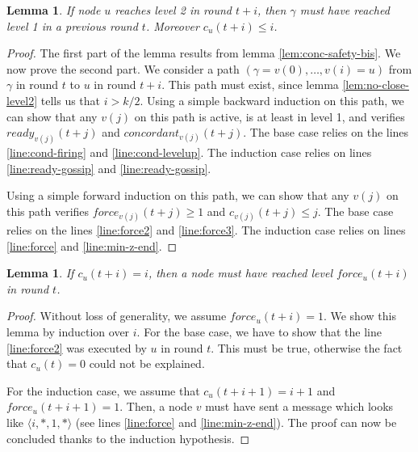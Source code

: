 \documentclass[11pt,letterpaper]{article}
\renewcommand{\leq}{\leqslant}
\renewcommand{\geq}{\geqslant}
\newtheorem{lem}[thm]{Lemma}
\newcommand{\cent}{\gamma}
\begin{document}
\begin{lem} \label{lem:ready-safety}
	If node $u$ reaches level 2 in round $t+i$, then $\cent$ must have reached level 1 in a previous round $t$. Moreover $c_u(t+i) \leq i$.
\end{lem}
\begin{proof}
	The first part of the lemma results from lemma \ref{lem:conc-safety-bis}. We now prove the second part.
	We consider a path $(\cent = v(0), \dots, v(i) = u)$ from $\cent$ in round $t$ to $u$ in round $t+i$. This path must exist, since lemma \ref{lem:no-close-level2} tells us that $i > k/2$.
	Using a simple backward induction on this path, we can show that any $v(j)$ on this path is active, is at least in level 1, and verifies $ready_{v(j)}(t+j)$ and $concordant_{v(j)}(t+j)$.
	The base case relies on the lines \ref{line:cond-firing} and \ref{line:cond-levelup}. The induction case relies on lines \ref{line:ready-gossip} and \ref{line:ready-gossip}.

	Using a simple forward induction on this path, we can show that any $v(j)$ on this path verifies $force_{v(j)}(t+j) \geq 1$ and $c_{v(j)}(t+j) \leq j$.
	The base case relies on the lines \ref{line:force2} and \ref{line:force3}. The induction case relies on lines \ref{line:force} and \ref{line:min-z-end}.
\end{proof}

\begin{lem} \label{lem:safety-force}
	If $c_u(t+i) = i$, then a node must have reached level $force_u(t+i)$ in round $t$.
\end{lem}
\begin{proof}
	Without loss of generality, we assume $force_u(t+i) = 1$.
	We show this lemma by induction over $i$.
	For the base case, we have to show that the line \ref{line:force2} was executed by $u$ in round $t$.
	This must be true, otherwise the fact that $c_u(t) = 0$ could not be explained.

	For the induction case, we assume that $c_u(t+i+1) = i+1$ and $force_u(t+i+1) = 1$.
	Then, a node $v$ must have sent a message which looks like $\langle i, *, 1, * \rangle$ (see lines \ref{line:force} and \ref{line:min-z-end}).
	The proof can now be concluded thanks to the induction hypothesis.
\end{proof}
\end{document}
